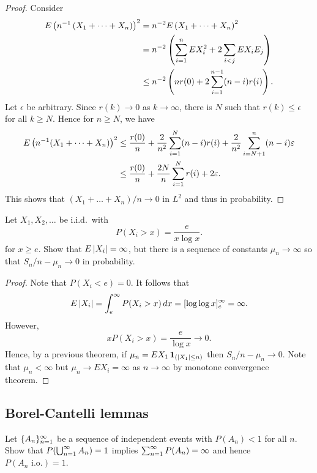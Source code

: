 \documentclass[a4paper]{article}
\begin{document}
\begin{proof}
  Consider 
  \begin{align*}
    E \left( n^{-1} \left( X_1 + \dots + X_n \right) \right)^2 
    &= n^{-2} E \left( X_1 + \dots + X_n \right)^2 \\
    &= n^{-2} \left( \sum_{i=1}^n E X_i^2 + 2 \sum_{i < j} E X_i E_j \right) \\
    &\leq n^{-2} \left( n r(0) + 2 \sum_{i=1}^{n - 1} (n - i) r(i) \right).
  \end{align*}
  Let $\epsilon$ be arbitrary. 
  Since $r(k) \to 0$ as $k \to \infty$, there is $N$ such that 
  $r(k) \leq \epsilon$ for all $k \geq N$. Hence for $n \geq N$, we have 
  \begin{align*}
    E \left( n^{-1} (X_1 + \dots + X_n) \right)^2 
    &\leq \frac{r(0)}{n} + \frac{2}{n^2} \sum_{i=1}^N (n - i) r(i) 
    + \frac{2}{n^2} \sum_{i = N + 1}^n (n - i) \varepsilon \\
    &\leq \frac{r(0)}{n} + \frac{2 N}{n} \sum_{i=1}^N r(i) 
    + 2 \varepsilon.
  \end{align*}
  This shows that $(X_1 + \dots + X_n) / n \to 0$ in $L^2$ and thus 
  in probability.

\end{proof}

\begin{ex}[Durrett 2.2.5]
  Let $X_1, X_2, \dots$ be i.i.d.\ with 
  \[
  P(X_i > x) = \frac{e}{x \log x}.
  \]
  for $x \geq e$.
  Show that $E \left\lvert X_i\right\rvert = \infty$, but there is a sequence of constants 
  $\mu_n \to \infty$ so that $S_n / n - \mu_n \to 0$ in probability.
\end{ex}

\begin{proof}
  Note that $P(X_i < e) = 0$. It follows that 
  \[
    E \left\lvert X_i\right\rvert 
    = \int_e^\infty P(X_i > x) \, d x 
    = [\log \log x]_e^\infty 
    = \infty.
  \]
  However, 
  \[
  x P(X_i > x) = \frac{e}{\log x} \to 0.
  \]
  Hence, by a previous theorem, if $\mu_n = E X_1 \operatorname{\mathbf{1}}_{(\left\lvert X_1\right\rvert \leq n)}$ 
  then $S_n / n - \mu_n \to 0$. Note that $\mu_n < \infty$ but 
  $\mu_n \to E X_i = \infty$ as $n \to \infty$ 
  by monotone convergence theorem.

\end{proof}

\subsection{Borel-Cantelli lemmas}

\begin{ex}[Durrett 2.3.8]
Let $\{ A_n \}_{n=1}^\infty$ be a sequence of independent events with $P(A_n) < 1$
for all $n$. Show that $P (\bigcup_{n=1}^\infty A_n) = 1$ 
implies $\sum_{n=1}^\infty P(A_n) = \infty$ and hence $P(A_n \text{ i.o.}) = 1$.
\end{ex}
\end{document}

